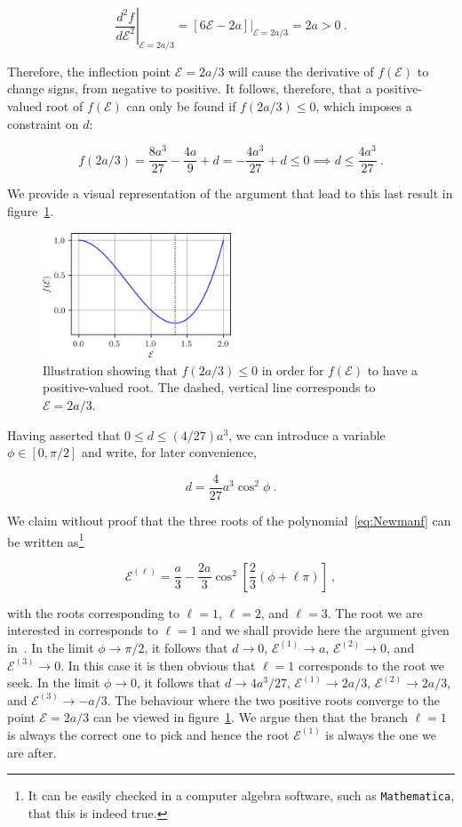\documentclass{article}
\newcommand{\Eps}{\mathcal{E}}
\newcommand{\eq}[1]{
\begin{equation}
    #1
\end{equation}
}
\begin{document}
\eq{
  \left.\frac{d^{2}f}{d\Eps^{2}}\right|_{\Eps=2a/3} = \left.\left[6\Eps - 2a\right]\right|_{\Eps=2a/3} = 2a > 0\ .
}

\noindent Therefore, the inflection point $\Eps=2a/3$ will cause the derivative of $f(\Eps)$ to change signs, from negative to positive. It follows, therefore, that a positive-valued root of $f(\Eps)$ can only be found if $f(2a/3)\leq0$, which imposes a constraint on $d$:

\eq{
  f\left(2a/3\right) = \frac{8a^{3}}{27} - \frac{4a}{9} + d = - \frac{4a^{3}}{27} + d \leq 0 \implies d \leq \frac{4a^{3}}{27}\ .
}

\noindent We provide a visual representation of the argument that lead to this last result in figure~\ref{fig:f_of_Eps}.

\begin{figure}[!htb]
    \centering
    \includegraphics[width=0.5\textwidth]{f_of_Eps.png}
    \caption{Illustration showing that $f(2a/3)\leq0$ in order for
      $f(\Eps)$ to have a positive-valued root. The dashed, vertical
      line corresponds to $\Eps=2a/3$.}
    \label{fig:f_of_Eps}
\end{figure}

Having asserted that $0\leq d \leq (4/27)a^{3}$, we can introduce a variable $\phi\in[0,\pi/2]$ and write, for later convenience,

\eq{
  d = \frac{4}{27}a^{3}\cos^{2}\phi\ .
}

\noindent We claim without proof that the three roots of the polynomial~\eqref{eq:Newmanf} can be written as\footnote{It can be easily checked in a computer algebra software, such as {\tt Mathematica}, that this is indeed true.}

\eq{
  \Eps^{(\ell)} = \frac{a}{3} - \frac{2a}{3}\cos^{2}\left[\frac{2}{3}\left(\phi+\ell\pi\right)\right]\ ,
}

\noindent with the roots corresponding to $\ell=1$, $\ell=2$, and $\ell=3$. The root we are interested in corresponds to $\ell=1$ and we shall provide here the argument given in~\cite{newman2014primitive}. In the limit $\phi\to\pi/2$, it follows that $d\to0$, $\Eps^{(1)}\to a$, $\Eps^{(2)}\to 0$, and $\Eps^{(3)}\to 0$. In this case it is then obvious that $\ell=1$ corresponds to the root we seek. In the limit $\phi\to0$, it follows that $d\to4a^{3}/27$, $\Eps^{(1)}\to2a/3$, $\Eps^{(2)}\to2a/3$, and $\Eps^{(3)}\to -a/3$. The behaviour where the two positive roots converge to the point $\Eps=2a/3$ can be viewed in figure~\ref{fig:f_of_Eps}. We argue then that the branch $\ell=1$ is always the correct one to pick and hence the root $\Eps^{(1)}$ is always the one we are after.
\end{document}
